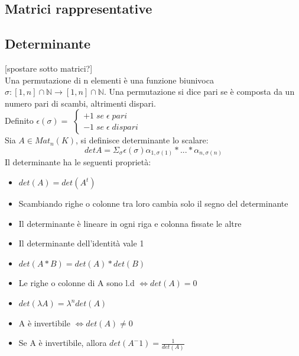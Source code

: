 \documentclass{article}
\newcommand{\N}{\mathds{N}}
\begin{document}
\subsection{Matrici rappresentative}

\subsection{Determinante}
[spostare sotto matrici?]\\
Una permutazione di n elementi è una funzione biunivoca $\sigma:[1,n]\cap\N\rightarrow[1,n]\cap\N$. Una permutazione si dice pari se è composta da un numero pari di scambi, altrimenti dispari.\\
Definito $\epsilon(\sigma)=$ $\begin{cases} +1\; se\; \epsilon\; pari\\ -1\; se\; \epsilon\; dispari \end{cases}$\\
Sia $A\in Mat_n(K)$, si definisce determinante lo scalare: $$detA=\Sigma_{\sigma}\epsilon(\sigma)\alpha_{1,\sigma(1)}*...*\alpha_{n,\sigma(n)}$$
Il determinante ha le seguenti proprietà:
\begin{itemize}
    \item $det(A)=det(A^t)$
    \item Scambiando righe o colonne tra loro cambia solo il segno del determinante
    \item Il determinante è lineare in ogni riga e colonna fissate le altre
    \item Il determinante dell'identità vale 1
    \item $det(A*B)=det(A)*det(B)$
    \item Le righe o colonne di A sono l.d $\Leftrightarrow det(A)=0$
    \item $det(\lambda A)=\lambda^n det(A)$
    \item A è invertibile $\Leftrightarrow det(A)\neq 0$
    \item Se A è invertibile, allora $det(A^-1)=\frac{1}{det(A)}$
\end{itemize}
\end{document}
